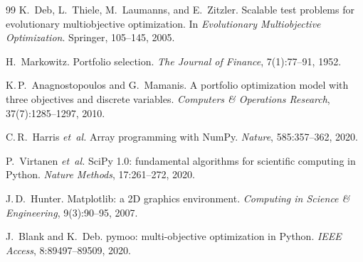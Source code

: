\documentclass[11pt,a4paper]{article}
\begin{document}
\begin{thebibliography}{99}
K.~Deb, L.~Thiele, M.~Laumanns, and E.~Zitzler.
Scalable test problems for evolutionary multiobjective optimization.
In \textit{Evolutionary Multiobjective Optimization}. Springer, 105--145, 2005.

H.~Markowitz.
Portfolio selection.
\textit{The Journal of Finance}, 7(1):77--91, 1952.

K.\,P.~Anagnostopoulos and G.~Mamanis.
A portfolio optimization model with three objectives and discrete variables.
\textit{Computers \& Operations Research}, 37(7):1285--1297, 2010.

C.\,R.~Harris \textit{et~al.}
Array programming with NumPy.
\textit{Nature}, 585:357--362, 2020.

P.~Virtanen \textit{et~al.}
SciPy 1.0: fundamental algorithms for scientific computing in Python.
\textit{Nature Methods}, 17:261--272, 2020.

J.\,D.~Hunter.
Matplotlib: a 2D graphics environment.
\textit{Computing in Science \& Engineering}, 9(3):90--95, 2007.

J.~Blank and K.~Deb.
pymoo: multi-objective optimization in Python.
\textit{IEEE Access}, 8:89497--89509, 2020.

\end{thebibliography}
\end{document}
